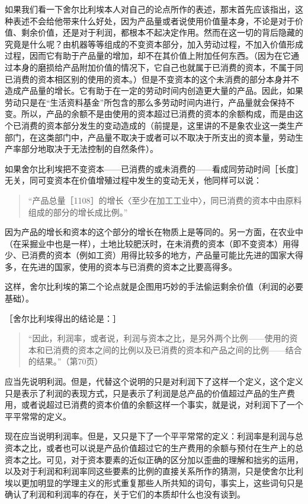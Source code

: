 如果我们看一下舍尔比利埃本人对自己的论点所作的表述，那末首先应该指出，这种表述不会给他带来什么好处，因为产品量或者说使用价值量本身，不论是对于价值、剩余价值，还是对于利润，都根本不起决定作用。然而在这一切的背后隐藏的究竟是什么呢？由机器等等组成的不变资本部分，加入劳动过程，不加入价值形成过程，因而它有助于产品量的增加，却不在其价值上附加任何东西。（因为在它通过本身的磨损给产品附加价值的情况下，它自己也就属于已消费的资本，不属于同已消费的资本相区别的使用的资本。）但是不变资本的这个未消费的部分本身并不造成产品量的增长。它有助于在一定的劳动时间内创造更大量的产品。因此，如果劳动只是在“生活资料基金”所包含的那么多劳动时间内进行，产品量就会保持不变。所以，产品的余额不是由使用的资本超过已消费的资本的余额构成，而是由这个已消费的资本部分发生的变动造成的（前提是，这里讲的不是象农业这一类生产部门，在这类部门中，产品量不取决于或者可以不取决于所支出的资本量，劳动生产率部分地取决于无法控制的自然条件）。

如果舍尔比利埃把不变资本——已消费的或未消费的——看成同劳动时间［长度］无关，同可变资本在价值增殖过程中发生的变动无关，他同样可以说：

\begin{quote}{“产品总量［1108］的增长〈至少在加工工业中〉，同已消费的资本中由原料组成的部分的增长成比例。”}\end{quote}

因为产品的增长和资本的这个部分的增长在物质上是等同的。另一方面，在农业中（在采掘业中也是一样），土地比较肥沃时，在未消费的资本（即不变资本）用得少、已消费的资本（例如工资）用得比较多的地方，产品量可能比先进的国家大得多，在先进的国家，使用的资本与已消费的资本之比要高得多。

这样，舍尔比利埃的第二个论点就是企图用巧妙的手法偷运剩余价值（利润的必要基础）。

［舍尔比利埃得出的结论是：］

\begin{quote}{“因此，利润率，或者说，利润与资本之比，是另外两个比例——使用的资本和已消费的资本之间的比例以及已消费的资本和产品之间的比例——结合的结果。”（第70页）}\end{quote}

应当先说明利润。但是，代替这个说明的只是对利润下了这样一个定义，这个定义只是表示了利润的表现方式，只是表示了利润是总产品的价值超过产品的生产费用，或者说超过已消费的资本价值的余额这样一个事实，就是说，对利润下了一个平平常常的定义。

现在应当说明利润率。但是，又只是下了一个平平常常的定义：利润率是利润与总资本之比，或者也可以说是产品价值超过它的生产费用的余额与预付在生产上的总资本之比。可见，对于资本要素的近似正确的区分加以歪曲的理解和拙劣的运用，以及对于利润和利润率同这些要素的比例的直接关系所作的猜测，只是使舍尔比利埃以更加明显的学理主义的形式重复那些人所共知的词句，事实上，这些词句只是确认了利润和利润率的存在，关于它们的本质却什么也没有谈到。

